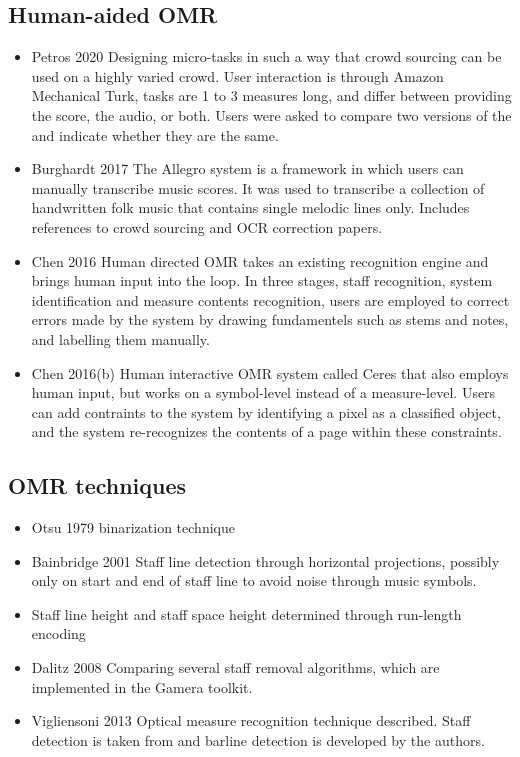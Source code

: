 \subsection{Human-aided OMR}
\begin{itemize}
    \item Petros 2020 \citep{Samiotis2020} Designing micro-tasks in such a way that crowd sourcing can be used on a highly varied crowd. User interaction is through Amazon Mechanical Turk, tasks are 1 to 3 measures long, and differ between providing the score, the audio, or both. Users were asked to compare two versions of the and indicate whether they are the same. \citep{Burghardt2017, Bellini2007, Chen2016, CalvoZaragoza2019}
    \item Burghardt 2017 \citep{Burghardt2017} The Allegro system is a framework in which users can manually transcribe music scores. It was used to transcribe a collection of handwritten folk music that contains single melodic lines only. Includes references to crowd sourcing and OCR correction papers. \citep{Bainbridge2001, Bellini2007, Raphael2011, Rebelo2012}
    \item Chen 2016 \citep{Chen2016} Human directed OMR takes an existing recognition engine and brings human input into the loop. In three stages, staff recognition, system identification and measure contents recognition, users are employed to correct errors made by the system by drawing fundamentels such as stems and notes, and labelling them manually.
    \item Chen 2016(b) \citep{Chen2016b} Human interactive OMR system called Ceres that also employs human input, but works on a symbol-level instead of a measure-level. Users can add contraints to the system by identifying a pixel as a classified object, and the system re-recognizes the contents of a page within these constraints.
\end{itemize}

\subsection{OMR techniques}
\begin{itemize}
    \item Otsu 1979 \citep{Otsu1979} binarization technique

    \item Bainbridge 2001 \citep{Bainbridge2001} Staff line detection through horizontal projections, possibly only on start and end of staff line to avoid noise through music symbols.

    \item Staff line height and staff space height determined through run-length encoding \citep{Rebelo2012}

    \item Dalitz 2008 \citep{Dalitz2008} Comparing several staff removal algorithms, which are implemented in the Gamera toolkit.

    \item Vigliensoni 2013 \citep{Vigliensoni2013} Optical measure recognition technique described. Staff detection is taken from \citep{} and barline detection is developed by the authors.
\end{itemize}

